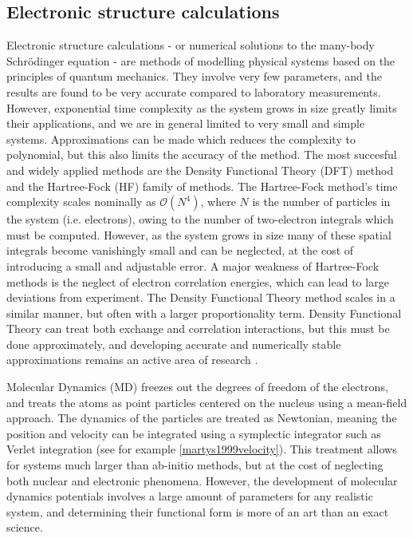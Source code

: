 \subsection{Electronic structure calculations}
Electronic structure calculations - or numerical solutions
to the many-body Schr\"{o}dinger equation - are methods of modelling
physical systems based on the principles of quantum mechanics.
They involve very few parameters, and the results are found
to be very accurate compared to laboratory measurements.
However, exponential time complexity as the system grows in size
greatly limits their applications,
and we are in general limited to very small and simple systems.
Approximations can be made which reduces the complexity 
to polynomial, but this also limits the accuracy of the method.
The most succesful and widely applied methods
are the Density Functional Theory (DFT) method
and the Hartree-Fock (HF) family of methods.
The Hartree-Fock method's time complexity 
scales nominally as $\mathcal{O}(N^4)$,
where $N$ is the number of particles in the system
(i.e. electrons), owing to the number of two-electron
integrals which must be computed.
However, as the system grows in size many of these spatial integrals
become vanishingly small and can be neglected, at the cost of
introducing a small and adjustable error.
A major weakness of Hartree-Fock methods is the neglect
of electron correlation energies, which can lead to
large deviations from experiment.
The Density Functional Theory method scales in a similar
manner, but often with a larger proportionality term.
Density Functional Theory can treat both exchange and correlation
interactions, but this must be done approximately,
and developing accurate and numerically stable approximations
remains an active area of research \cite{gillan2016perspective}.
\par
Molecular Dynamics (MD) freezes out the degrees of freedom of the
electrons, and treats the atoms as point particles centered on
the nucleus using a mean-field approach.
The dynamics of the particles are treated as Newtonian,
meaning the position and velocity can be integrated using a
symplectic integrator such as Verlet integration
    (see for example \ref{martys1999velocity}).
This treatment allows for systems much larger
than ab-initio methods, but at the cost of neglecting
both nuclear and electronic phenomena.
However, the development of molecular dynamics potentials
involves a large amount of parameters for any realistic system,
and determining their functional form is more of an
art than an exact science.
\par
